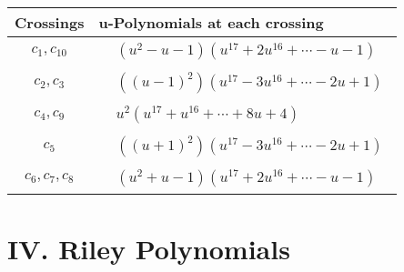 \documentclass[1p]{elsarticle_modified}
\theoremstyle{definition}
\begin{document}
\begin{tabular}{m{50pt}|m{274pt}}
Crossings & \hspace{64pt}u-Polynomials at each crossing \\
\hline $$\begin{aligned}c_{1},c_{10}\end{aligned}$$&$\begin{aligned}
&(u^2- u-1)(u^{17}+2 u^{16}+\cdots- u-1)
\end{aligned}$\\
\hline $$\begin{aligned}c_{2},c_{3}\end{aligned}$$&$\begin{aligned}
&((u-1)^2)(u^{17}-3 u^{16}+\cdots-2 u+1)
\end{aligned}$\\
\hline $$\begin{aligned}c_{4},c_{9}\end{aligned}$$&$\begin{aligned}
&u^2(u^{17}+u^{16}+\cdots+8 u+4)
\end{aligned}$\\
\hline $$\begin{aligned}c_{5}\end{aligned}$$&$\begin{aligned}
&((u+1)^2)(u^{17}-3 u^{16}+\cdots-2 u+1)
\end{aligned}$\\
\hline $$\begin{aligned}c_{6},c_{7},c_{8}\end{aligned}$$&$\begin{aligned}
&(u^2+u-1)(u^{17}+2 u^{16}+\cdots- u-1)
\end{aligned}$\\
\hline
\end{tabular}\newpage\renewcommand{\arraystretch}{1}
\centering \section*{ IV. Riley Polynomials}
\end{document}
